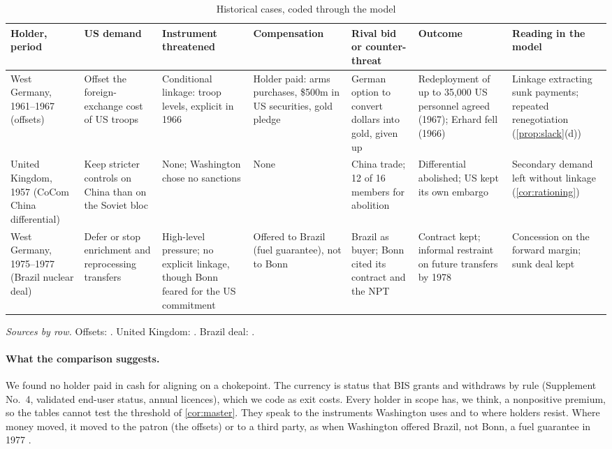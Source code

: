 \begin{table}[p]
\centering
\scriptsize
\setlength{\tabcolsep}{2.5pt}
\caption{Historical cases, coded through the model}\label{tab:history}
\begin{tabularx}{\textwidth}{@{}>{\raggedright\arraybackslash}p{1.7cm}*{6}{>{\raggedright\arraybackslash}X}@{}}
\toprule
Holder, period & US demand & Instrument threatened & Compensation & Rival bid or counter-threat & Outcome & Reading in the model\\
\midrule
West Germany, 1961--1967 (offsets) & Offset the foreign-exchange cost of US troops & Conditional linkage: troop levels, explicit in 1966 & Holder paid: arms purchases, \$500m in US securities, gold pledge & German option to convert dollars into gold, given up & Redeployment of up to 35,000 US personnel agreed (1967); Erhard fell (1966) & Linkage extracting sunk payments; repeated renegotiation (\cref{prop:slack}(d))\\
\addlinespace
United Kingdom, 1957 (CoCom China differential) & Keep stricter controls on China than on the Soviet bloc & None; Washington chose no sanctions & None & China trade; 12 of 16 members for abolition & Differential abolished; US kept its own embargo & Secondary demand left without linkage (\cref{cor:rationing})\\
\addlinespace
West Germany, 1975--1977 (Brazil nuclear deal) & Defer or stop enrichment and reprocessing transfers & High-level pressure; no explicit linkage, though Bonn feared for the US commitment & Offered to Brazil (fuel guarantee), not to Bonn & Brazil as buyer; Bonn cited its contract and the NPT & Contract kept; informal restraint on future transfers by 1978 & Concession on the forward margin; sunk deal kept\\
\bottomrule
\end{tabularx}
\par\smallskip
\begin{minipage}{\textwidth}\scriptsize
\emph{Sources by row.} Offsets: \citet{frus1995foreignecon, frus1995westerneurope, frus1999germany, bundesbank1967blessing}. United Kingdom: \citet{frus1989economicdefense, hansard1957china}. Brazil deal: \citet{frus2015southamerica, frus2014westerneurope, frus2015nonproliferation}.
\end{minipage}
\end{table}

\paragraph{What the comparison suggests.} We found no holder paid in cash for aligning on a chokepoint. The currency is status that BIS grants and withdraws by rule (Supplement No.~4, validated end-user status, annual licences), which we code as exit costs. Every holder in scope has, we think, a nonpositive premium, so the tables cannot test the threshold of \cref{cor:master}. They speak to the instruments Washington uses and to where holders resist. Where money moved, it moved to the patron (the offsets) or to a third party, as when Washington offered Brazil, not Bonn, a fuel guarantee in 1977 \citep{frus2015nonproliferation}.

